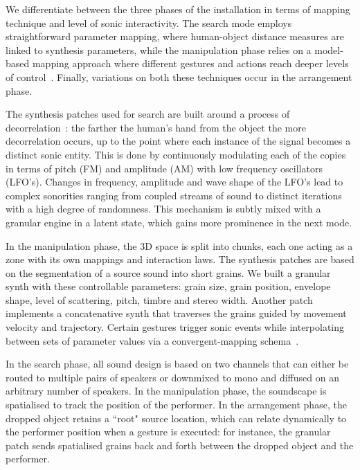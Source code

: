 We differentiate between the three phases of the installation in terms of mapping technique and level of sonic interactivity. The search mode employs straightforward parameter mapping, where human-object distance measures are linked to synthesis parameters, while the manipulation phase relies on a model-based mapping approach where different gestures and actions reach deeper levels of control~\cite{hermann2011sonification}. Finally, variations on both these techniques occur in the arrangement phase.

The synthesis patches used for search are built around a process of decorrelation~\cite{kendall1995decorrelation}: the farther the human's hand from the object the more decorrelation occurs, up to the point where each instance of the signal becomes a distinct sonic entity. This is done by continuously modulating each of the copies in terms of pitch (FM) and amplitude (AM) with low frequency oscillators (LFO’s). Changes in frequency, amplitude and wave shape of the LFO’s lead to complex sonorities ranging from coupled streams of sound to distinct iterations with a high degree of randomness. %
This mechanism is subtly mixed with a granular engine in a latent state, which gains more prominence in the next mode.

In the manipulation phase, the 3D space is split into chunks, each one acting as a zone with its own mappings and interaction laws. The synthesis patches are based on the segmentation of a source sound into short grains. We built a granular synth with these controllable parameters: grain size, grain position, envelope shape, level of scattering, pitch, timbre and stereo width. Another patch implements a concatenative synth that traverses the grains guided by movement velocity and trajectory. Certain gestures trigger sonic events while interpolating between sets of parameter values via a convergent-mapping schema~\cite{hunt2000mapping}. %


In the search phase, all sound design is based on two channels that can either be routed to multiple pairs of speakers or downmixed to mono and diffused on an arbitrary number of speakers. In the manipulation phase, the soundscape is spatialised to track the position of the performer. In the arrangement phase, the dropped object retains a ``root" source location, which can relate dynamically to the performer position when a gesture is executed: for instance, the granular patch sends spatialised grains back and forth between the dropped object and the performer.


